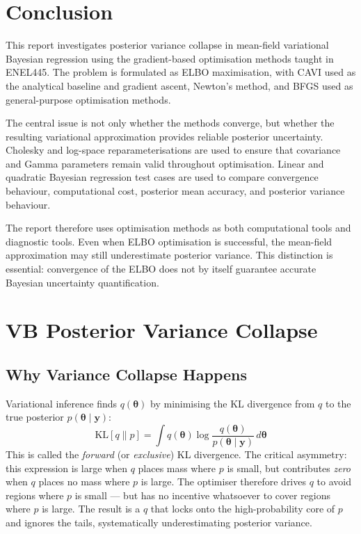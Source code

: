 \documentclass[11pt,a4paper]{article}
\begin{document}
\section{Conclusion}

This report investigates posterior variance collapse in mean-field variational Bayesian regression using the gradient-based optimisation methods taught in ENEL445. The problem is formulated as ELBO maximisation, with CAVI used as the analytical baseline and gradient ascent, Newton's method, and BFGS used as general-purpose optimisation methods.

The central issue is not only whether the methods converge, but whether the resulting variational approximation provides reliable posterior uncertainty. Cholesky and log-space reparameterisations are used to ensure that covariance and Gamma parameters remain valid throughout optimisation. Linear and quadratic Bayesian regression test cases are used to compare convergence behaviour, computational cost, posterior mean accuracy, and posterior variance behaviour.

The report therefore uses optimisation methods as both computational tools and diagnostic tools. Even when ELBO optimisation is successful, the mean-field approximation may still underestimate posterior variance. This distinction is essential: convergence of the ELBO does not by itself guarantee accurate Bayesian uncertainty quantification.

\newpage
\nocite{*}
\printbibliography
\setcounter{secnumdepth}{1}
\appendix
\renewcommand{\thesection}{Appendix~\Alph{section}}


\section{VB Posterior Variance Collapse}
\label{app:vb-collapse}

\subsection*{Why Variance Collapse Happens}

Variational inference finds $q(\bm{\theta})$ by minimising the KL divergence from $q$ to the true posterior $p(\bm{\theta}\mid\bm{y})$:
\begin{equation}
  \mathrm{KL}[q \| p] = \int q(\bm{\theta}) \log \frac{q(\bm{\theta})}{p(\bm{\theta}\mid\bm{y})} \, d\bm{\theta}
\end{equation}
This is called the \emph{forward} (or \emph{exclusive}) KL divergence. The critical asymmetry: this expression is large when $q$ places mass where $p$ is small, but contributes \emph{zero} when $q$ places no mass where $p$ is large. The optimiser therefore drives $q$ to avoid regions where $p$ is small --- but has no incentive whatsoever to cover regions where $p$ is large. The result is a $q$ that locks onto the high-probability core of $p$ and ignores the tails, systematically underestimating posterior variance.
\end{document}
